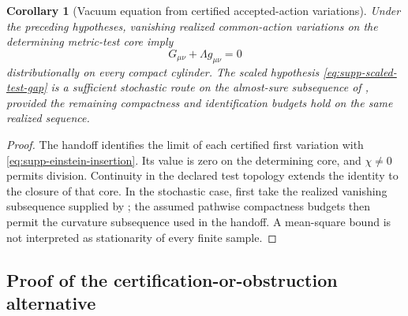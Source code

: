 \documentclass[11pt]{article}
\newtheorem{corollary}[corollary]{Corollary}
\theoremstyle{definition}
\theoremstyle{remark}
\begin{document}
\begin{corollary}[Vacuum equation from certified accepted-action variations]
\label{cor:supp-renewal-einstein}
Under the preceding hypotheses, vanishing realized common-action variations
on the determining metric-test core imply
\[
 \boxed{G_{\mu\nu}+\Lambda g_{\mu\nu}=0}
\]
distributionally on every compact cylinder.  The scaled hypothesis
\eqref{eq:supp-scaled-test-gap} is a sufficient stochastic route on the
almost-sure subsequence of ,
provided the remaining compactness and identification budgets hold on the
same realized sequence.
\end{corollary}
\begin{proof}
The handoff identifies the limit of each certified first variation with
\eqref{eq:supp-einstein-insertion}.  Its value is zero on the determining
core, and $\chi\ne0$ permits division.  Continuity in the declared test
topology extends the identity to the closure of that core.  In the stochastic
case, first take the realized vanishing subsequence supplied by
; the assumed pathwise compactness
budgets then permit the curvature subsequence used in the handoff.
A mean-square bound is not interpreted as stationarity of every finite
sample.
\end{proof}

\subsection{Proof of the certification-or-obstruction alternative}
\end{document}
